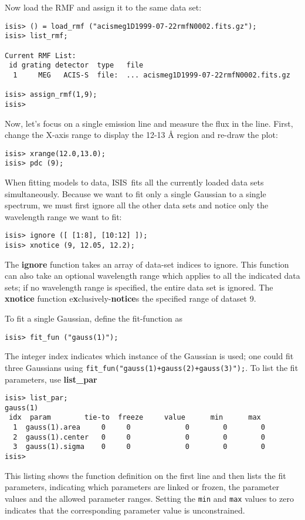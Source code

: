 \documentclass{book}
\newcommand{\isisx}{{\sc ISIS~}}
\begin{document}
Now load the RMF and assign it to the same data set:
\begin{verbatim}
isis> () = load_rmf ("acismeg1D1999-07-22rmfN0002.fits.gz");
isis> list_rmf;

Current RMF List:
 id grating detector  type   file
  1     MEG   ACIS-S  file:  ... acismeg1D1999-07-22rmfN0002.fits.gz

isis> assign_rmf(1,9);
isis>
\end{verbatim}

Now, let's focus on a single emission line and measure the flux in
the line. First, change the X-axis range to display the 12-13 \AA
region and re-draw the plot:
\begin{verbatim}
isis> xrange(12.0,13.0);
isis> pdc (9);
\end{verbatim}
When fitting models to data, \isisx fits all the currently loaded data sets
simultaneously.  Because we want to fit only a single Gaussian to a single
spectrum, we must first ignore all the other data sets and notice only the
wavelength range we want to fit:
\begin{verbatim}
isis> ignore ([ [1:8], [10:12] ]);
isis> xnotice (9, 12.05, 12.2);
\end{verbatim}
The {\bf ignore} function takes an array of data-set indices to
ignore. This function can also take an optional wavelength range
which applies to all the indicated data sets; if no wavelength range is
specified, the entire data set is ignored.  The {\bf xnotice}
function e{\bf x}clusively-{\bf notice}s the specified range
of dataset 9.

To fit a single Gaussian, define the fit-function as
\begin{verbatim}
isis> fit_fun ("gauss(1)");
\end{verbatim}
The integer index indicates which instance of the Gaussian is
used; one could fit three Gaussians using
\verb|fit_fun("gauss(1)+gauss(2)+gauss(3)");|. To list the fit
parameters, use {\bf list\_par}
\begin{verbatim}
isis> list_par;
gauss(1)
 idx  param        tie-to  freeze     value      min      max
  1  gauss(1).area     0     0             0        0        0
  2  gauss(1).center   0     0             0        0        0
  3  gauss(1).sigma    0     0             0        0        0
isis>
\end{verbatim}
This listing shows the function definition on the first line and
then lists the fit parameters, indicating which parameters are
linked or frozen, the parameter values and the allowed parameter
ranges.  Setting the {\tt min} and {\tt max} values to zero
indicates that the corresponding parameter value is unconstrained.
\end{document}
